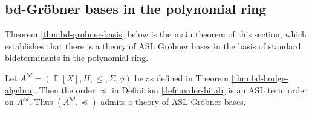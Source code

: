 \documentclass[11pt,reqno]{amsart}
\DeclareMathOperator{\F}{\mathbb{F}}
\newcommand{\gb}{Gr\"{o}bner }
\theoremstyle{definition}
\numberwithin{equation}{section}
\begin{document}
\subsection{bd-\gb bases in the polynomial ring}

Theorem \ref{thm:bd-grobner-basis} below is the main theorem of this section, which establishes that there is a theory of ASL Gröbner bases in the basis of standard bideterminants in the polynomial ring.

\begin{theorem}[store=thmbdgrobnerbasis]
\label{thm:bd-grobner-basis} 
Let $A^{bd} = (\F[X], H, \le, \Sigma, \phi)$ be as defined in Theorem \ref{thm:bd-hodge-algebra}. Then the order $\preceq$ in Definition \ref{defn:order-bitab} is an ASL term order on $A^{bd}$. Thus $(A^{bd}, \preceq)$ admits a theory of ASL Gröbner bases.
\end{theorem}
\end{document}
